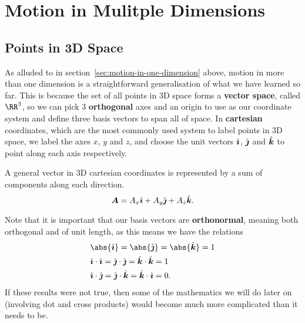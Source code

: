 \documentclass[../classical_mechanics.tex]{subfiles}
\begin{document}
    \section{Motion in Mulitple Dimensions}\label{sec:motion-in-multiple-dimensions}
        \subsection{Points in 3D Space}\label{subsec:points-in-3d-space}
            As alluded to in section~\ref{sec:motion-in-one-dimension} above, motion in more than one dimension is a straightforward generalisation of what we have learned so far.
            This is because the set of all points in 3D space forms a \textbf{vector space}, called $\RR^3$, so we can pick 3 \textbf{orthogonal} axes and an origin to use as our coordinate system and define three basis vectors to span all of space.
            In \textbf{cartesian} coordinates, which are the most commonly used system to label points in 3D space, we label the axes $x$, $y$ and $z$, and choose the unit vectors $\hat{\boldsymbol{\imath}}$, $\hat{\boldsymbol{\jmath}}$ and $\hat{\boldsymbol{k}}$ to point along each axis respectively.
            \begin{figure}[H]
                \centering
            \end{figure}

            A general vector in 3D cartesian coordinates is represented by a sum of components along each direction.
            \begin{equation}
                \boldsymbol{A}=A_x\hat{\boldsymbol{\imath}}+A_y\hat{\boldsymbol{\jmath}}+A_z\hat{\boldsymbol{k}}.
            \end{equation}

            Note that it is important that our basis vectors are \textbf{orthonormal}, meaning both orthogonal and of unit length, as this means we have the relations
            \begin{align}
                &\abs{\ihat}=\abs{\jhat}=\abs{\khat}=1\label{eq:basis-vec-magnitude}\\
                &\ihat\cdot\ihat=\jhat\cdot\jhat=\khat\cdot\khat=1\label{eq:basis-vec-normal}\\
                &\ihat\cdot\jhat=\jhat\cdot\khat=\khat\cdot\ihat=0\label{eq:basis-vec-ortho}.
            \end{align}
            If these results were not true, then some of the mathematics we will do later on (involving dot and cross products) would become much more complicated than it needs to be.
            
\end{document}
